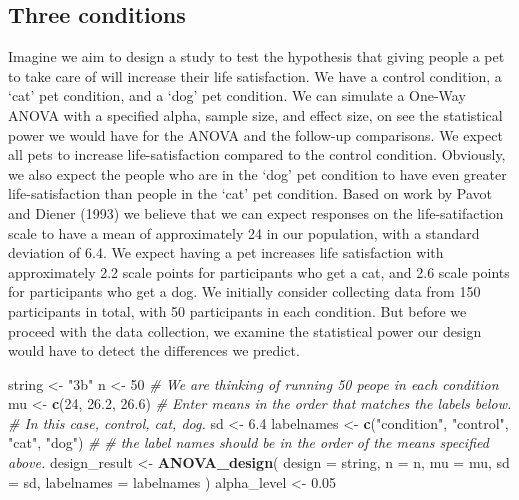 \documentclass[]{book}
\newenvironment{Shaded}{\begin{snugshade}}{\end{snugshade}}
\newcommand{\CommentTok}[1]{\textcolor[rgb]{0.56,0.35,0.01}{\textit{#1}}}
\newcommand{\DataTypeTok}[1]{\textcolor[rgb]{0.13,0.29,0.53}{#1}}
\newcommand{\DecValTok}[1]{\textcolor[rgb]{0.00,0.00,0.81}{#1}}
\newcommand{\FloatTok}[1]{\textcolor[rgb]{0.00,0.00,0.81}{#1}}
\newcommand{\KeywordTok}[1]{\textcolor[rgb]{0.13,0.29,0.53}{\textbf{#1}}}
\newcommand{\NormalTok}[1]{#1}
\newcommand{\StringTok}[1]{\textcolor[rgb]{0.31,0.60,0.02}{#1}}
\begin{document}
\hypertarget{three-conditions}{%
\subsection{Three conditions}\label{three-conditions}}

Imagine we aim to design a study to test the hypothesis that giving people a pet to take care of will increase their life satisfaction. We have a control condition, a `cat' pet condition, and a `dog' pet condition. We can simulate a One-Way ANOVA with a specified alpha, sample size, and effect size, on see the statistical power we would have for the ANOVA and the follow-up comparisons. We expect all pets to increase life-satisfaction compared to the control condition. Obviously, we also expect the people who are in the `dog' pet condition to have even greater life-satisfaction than people in the `cat' pet condition. Based on work by Pavot and Diener (1993) we believe that we can expect responses on the life-satifaction scale to have a mean of approximately 24 in our population, with a standard deviation of 6.4. We expect having a pet increases life satisfaction with approximately 2.2 scale points for participants who get a cat, and 2.6 scale points for participants who get a dog. We initially consider collecting data from 150 participants in total, with 50 participants in each condition. But before we proceed with the data collection, we examine the statistical power our design would have to detect the differences we predict.

\begin{Shaded}
\begin{Highlighting}[]
\NormalTok{string <-}\StringTok{ "3b"}
\NormalTok{n <-}\StringTok{ }\DecValTok{50}
\CommentTok{# We are thinking of running 50 peope in each condition}
\NormalTok{mu <-}\StringTok{ }\KeywordTok{c}\NormalTok{(}\DecValTok{24}\NormalTok{, }\FloatTok{26.2}\NormalTok{, }\FloatTok{26.6}\NormalTok{)}
\CommentTok{# Enter means in the order that matches the labels below.}
\CommentTok{# In this case, control, cat, dog.}
\NormalTok{sd <-}\StringTok{ }\FloatTok{6.4}
\NormalTok{labelnames <-}\StringTok{ }\KeywordTok{c}\NormalTok{(}\StringTok{"condition"}\NormalTok{, }\StringTok{"control"}\NormalTok{, }\StringTok{"cat"}\NormalTok{, }\StringTok{"dog"}\NormalTok{) }\CommentTok{#}
\CommentTok{# the label names should be in the order of the means specified above.}
\NormalTok{design_result <-}\StringTok{ }\KeywordTok{ANOVA_design}\NormalTok{(}
\DataTypeTok{design =}\NormalTok{ string,}
\DataTypeTok{n =}\NormalTok{ n,}
\DataTypeTok{mu =}\NormalTok{ mu,}
\DataTypeTok{sd =}\NormalTok{ sd,}
\DataTypeTok{labelnames =}\NormalTok{ labelnames}
\NormalTok{)}
\NormalTok{alpha_level <-}\StringTok{ }\FloatTok{0.05}
\end{Highlighting}
\end{Shaded}
\end{document}
